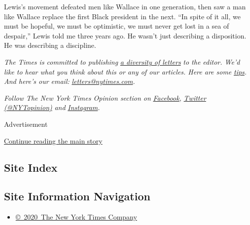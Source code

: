 Lewis's movement defeated men like Wallace in one generation, then saw a
man like Wallace replace the first Black president in the next. ``In
spite of it all, we must be hopeful, we must be optimistic, we must
never get lost in a sea of despair,'' Lewis told me three years ago. He
wasn't just describing a disposition. He was describing a discipline.

\emph{The Times is committed to publishing}
\href{https://www.nytimes.com/2019/01/31/opinion/letters/letters-to-editor-new-york-times-women.html}{\emph{a
diversity of letters}} \emph{to the editor. We'd like to hear what you
think about this or any of our articles. Here are some}
\href{https://help.nytimes.com/hc/en-us/articles/115014925288-How-to-submit-a-letter-to-the-editor}{\emph{tips}}\emph{.
And here's our email:}
\href{mailto:letters@nytimes.com}{\emph{letters@nytimes.com}}\emph{.}

\emph{Follow The New York Times Opinion section on}
\href{https://www.facebook.com/nytopinion}{\emph{Facebook}}\emph{,}
\href{http://twitter.com/NYTOpinion}{\emph{Twitter (@NYTopinion)}}
\emph{and}
\href{https://www.instagram.com/nytopinion/}{\emph{Instagram}}\emph{.}

Advertisement

\protect\hyperlink{after-bottom}{Continue reading the main story}

\hypertarget{site-index}{%
\subsection{Site Index}\label{site-index}}

\hypertarget{site-information-navigation}{%
\subsection{Site Information
Navigation}\label{site-information-navigation}}

\begin{itemize}
\tightlist
\item
  \href{https://help.nytimes.com/hc/en-us/articles/115014792127-Copyright-notice}{©~2020~The
  New York Times Company}
\end{itemize}

